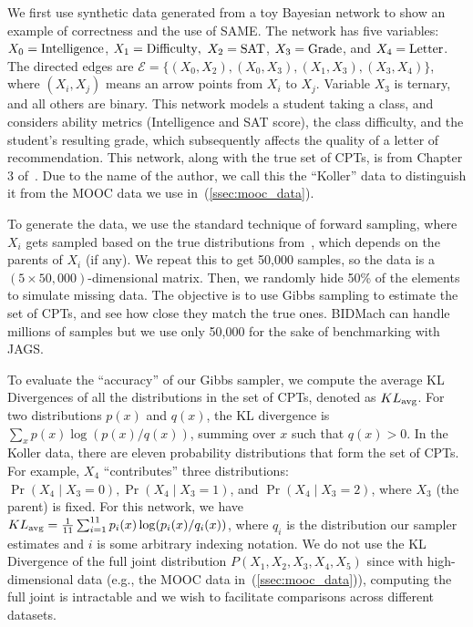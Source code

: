 \documentclass{article} %
\begin{document}
We first use synthetic data generated from a toy Bayesian network to show an example of correctness
and the use of SAME. The network has five variables: $X_0 = {\rm Intelligence}$, $X_1 =
{\rm Difficulty},$ $X_2 = {\rm SAT}$, $X_3 = {\rm Grade}$, and $X_4 = {\rm Letter}$. The directed
edges are $\mathcal{E} = \{(X_0, X_2), (X_0, X_3), (X_1,X_3), (X_3,X_4)\}$, where $(X_i,X_j)$ means
an arrow points from $X_i$ to $X_j$.  Variable $X_3$ is ternary, and all others are binary. This
network models a student taking a class, and considers ability metrics (Intelligence and SAT score),
the class difficulty, and the student's resulting grade, which subsequently affects the quality of a
letter of recommendation. This network, along with the true set of CPTs, is from Chapter 3
of~\citet{Koller2009}. Due to the name of the author, we call this the ``Koller'' data to
distinguish it from the MOOC data we use in~(\ref{ssec:mooc_data}).

To generate the data, we use the standard technique of forward sampling, where $X_i$ gets sampled
based on the true distributions from~\citet{Koller2009}, which depends on the parents of $X_i$ (if
any). We repeat this to get 50,000 samples, so the data is a $(5\times 50,000)$-dimensional matrix.
Then, we randomly hide 50\% of the elements to simulate missing data. The objective is to use Gibbs
sampling to estimate the set of CPTs, and see how close they match the true ones. BIDMach can handle
millions of samples but we use only 50,000 for the sake of benchmarking with JAGS.

To evaluate the ``accuracy'' of our Gibbs sampler, we compute the average KL Divergences of all the
distributions in the set of CPTs, denoted as $KL_{\rm avg}$.  For two distributions $p(x)$ and
$q(x)$, the KL divergence is $\sum_x p(x) \log(p(x)/q(x))$, summing over $x$ such that $q(x) > 0$.
In the Koller data, there are eleven probability distributions that form the set of CPTs. For
example, $X_4$ ``contributes'' three distributions: $\Pr(X_4 \mid X_3 = 0), \Pr(X_4 \mid X_3 = 1)$,
and $\Pr(X_4 \mid X_3 = 2)$, where $X_3$ (the parent) is fixed. For this network, we have $KL_{\rm
avg} = \frac{1}{11} \sum_{i=1}^{11} p_i(x) \log(p_i(x)/q_i(x))$, where $q_i$ is the distribution our
sampler estimates and $i$ is some arbitrary indexing notation. We do not use the KL Divergence of
the full joint distribution $P(X_1,X_2,X_3,X_4,X_5)$ since with high-dimensional data (e.g., the
MOOC data in~(\ref{ssec:mooc_data})), computing the full joint is intractable and we wish to
facilitate comparisons across different datasets.
\end{document}
